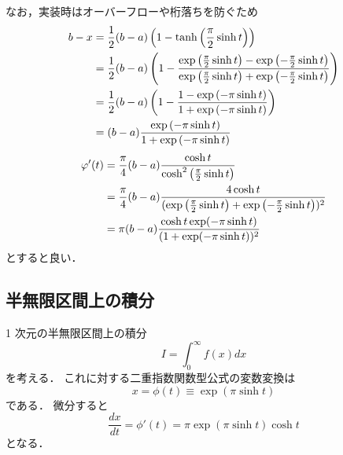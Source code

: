 なお，実装時はオーバーフローや桁落ちを防ぐため
\begin{align}
    b - x
     & = \frac{1}{2}(b - a) \left(1 - \tanh \left(\frac{\pi}{2} \sinh{t}\right) \right)
    \notag                                                                                 \\
     & = \frac{1}{2}(b - a) \left(1 -
    \frac{\exp\left(\frac{\pi}{2} \sinh{t}\right) - \exp\left(-\frac{\pi}{2} \sinh{t}\right)}%
    {\exp\left(\frac{\pi}{2} \sinh{t}\right) + \exp\left(-\frac{\pi}{2} \sinh{t}\right)}\right)
    \notag                                                                                 \\
     & = \frac{1}{2}(b - a) \left(1 -
    \frac{1 - \exp\left(-\pi \sinh{t}\right)}{1 + \exp\left(-\pi \sinh{t}\right)}\right)
    \notag                                                                                 \\
     & = (b - a) \frac{\exp\left(-\pi \sinh{t}\right)}{1 + \exp\left(-\pi \sinh{t}\right)}
\end{align}
\begin{align}
    \phi'(t)
     & = \frac{\pi}{4} (b - a) \frac{\cosh{t}}{\cosh^2 \left(\frac{\pi}{2} \sinh{t}\right)}
    \notag                                                                                  \\
     & = \frac{\pi}{4} (b - a) \frac{4 \cosh{t}}                                            %
    {(\exp\left(\frac{\pi}{2} \sinh{t}\right) + \exp\left(-\frac{\pi}{2} \sinh{t}\right))^2}
    \notag                                                                                  \\
     & = \pi (b - a) \frac{\cosh{t} \exp(-\pi \sinh{t})}{(1 + \exp(-\pi \sinh{t}))^2}
\end{align}
とすると良い\cite[Section 4.5.2]{Press2007}．

\subsection{半無限区間上の積分}

1 次元の半無限区間上の積分
\begin{equation}
    I = \int_{0}^{\infty} f(x) dx
\end{equation}
を考える．
これに対する二重指数関数型公式の変数変換は
\begin{equation}
    x = \phi(t) \equiv \exp(\pi \sinh{t})
\end{equation}
である\cite[Section 4.5.3]{Press2007}．
微分すると
\begin{equation}
    \frac{dx}{dt} = \phi'(t)
    = \pi \exp(\pi \sinh{t}) \cosh{t}
\end{equation}
となる．

